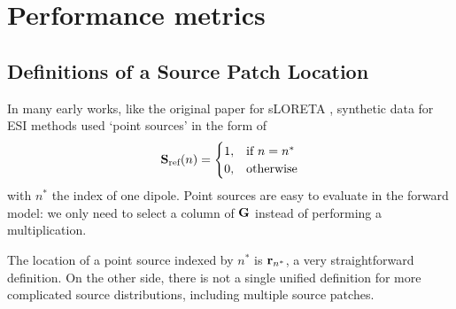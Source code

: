 
\section{Performance metrics}

\subsection{Definitions of a Source Patch Location}

In many early works, like the original paper for sLORETA \cite{sloreta}, synthetic data for ESI methods used `point sources' in the form of
\begin{equation}
    \mathbf{S}_\text{ref}(n) = \begin{cases}
        1, &\text{if } n = n^* \\
        0, &\text{otherwise}
    \end{cases}
\end{equation}
with $n^*$ the index of one dipole.
%
Point sources are easy to evaluate in the forward model: we only need to select a column of $\mathbf{G}$ instead of performing a multiplication.

The location of a point source indexed by $n^*$ is $\mathbf{r}_{n^*}$, a very straightforward definition.
%
On the other side, there is not a single unified definition for more complicated source distributions, including multiple source patches.

%
%
%

%

